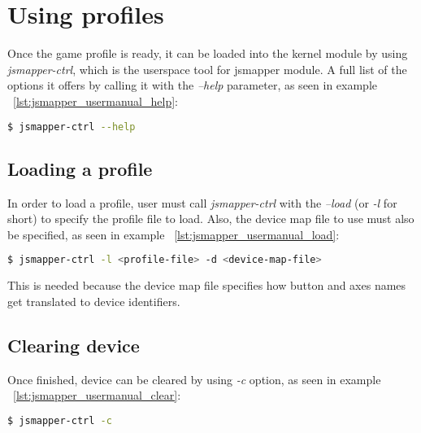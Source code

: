 \section{Using profiles}

Once the game profile is ready, it can be loaded into the kernel module by using \emph{jsmapper-ctrl}, which is the userspace tool for jsmapper module. A full list of the options it offers by calling it with the \emph{--help} parameter, as seen in example ~\ref{lst:jsmapper_usermanual_help}:
\begin{lstlisting}[language=bash,caption={Getting help},label={lst:jsmapper_usermanual_help}]
$ jsmapper-ctrl --help
\end{lstlisting}

\subsection{Loading a profile}
In order to load a profile, user must call \emph{jsmapper-ctrl} with the \emph{--load} (or \emph{-l} for short) to specify the profile file to load. Also, the device map file to use must also be specified, as seen in example ~\ref{lst:jsmapper_usermanual_load}:
\begin{lstlisting}[language=bash,caption={Loading a profile},label={lst:jsmapper_usermanual_load}]
$ jsmapper-ctrl -l <profile-file> -d <device-map-file>
\end{lstlisting}

This is needed because the device map file specifies how button and axes names get translated to device identifiers.

\subsection{Clearing device}
Once finished, device can be cleared by using \emph{-c} option, as seen in example ~\ref{lst:jsmapper_usermanual_clear}:
\begin{lstlisting}[language=bash,caption={Clearing device},label={lst:jsmapper_usermanual_clear}]
$ jsmapper-ctrl -c 
\end{lstlisting}
